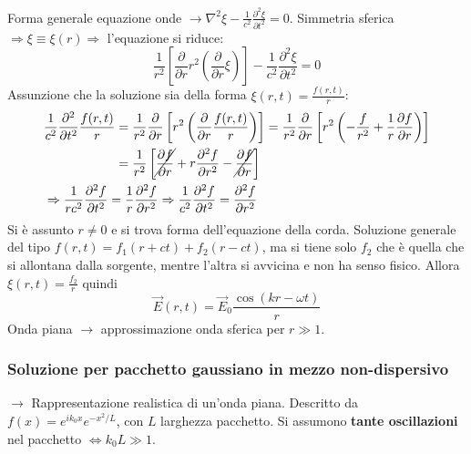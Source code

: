 \documentclass[10pt, a4paper]{scrartcl}
\numberwithin{equation}{subsection}
\theoremstyle{style1}
\begin{document}
Forma generale equazione onde $\to \nabla ^2 \xi  - \frac{1}{c^2} \frac{\partial ^2 \xi }{\partial t^2} = 0$. Simmetria sferica $\Rightarrow \xi \equiv \xi (r)\Rightarrow $ l'equazione si riduce:
\begin{equation}
	\frac{1}{r^2}\left[ \frac{\partial }{\partial r} r^2 \left(\frac{\partial }{\partial r} \xi \right)  \right]  -\frac{1}{c^2}\frac{\partial ^2\xi }{\partial t^2} =0
\end{equation}
Assunzione che la soluzione sia della forma $\xi (r,t) = \frac{f(r,t)}{r}$:
\begin{equation}
\begin{split}
	&\begin{split}
		\frac{1}{c^2}\frac{\partial ^2}{\partial t^2} \frac{f(r,t)}{r}&= \frac{1}{r^2}\frac{\partial }{\partial r} \left[ r^2 \left(\frac{\partial }{\partial r} \frac{f(r,t)}{r}\right)  \right] = \frac{1}{r^2 }\frac{\partial }{\partial r} \left[ r^2\left(-\frac{f}{r^2}+ \frac{1}{r}\frac{\partial f}{\partial r} \right)  \right] \\
									      &=\frac{1}{r^2}\left[ \cancel{\frac{\partial f}{\partial r} } + r \frac{\partial ^2 f}{\partial r^2} -\cancel{\frac{\partial f}{\partial r} } \right] 
	\end{split}\\
	&\Rightarrow \frac{1}{rc^2}\frac{\partial ^2f}{\partial t^2} = \frac{1}{r}\frac{\partial ^2 f}{\partial r^2} \Rightarrow \frac{1}{c^2}\frac{\partial ^2 f}{\partial t^2} = \frac{\partial ^2 f}{\partial r^2}
\end{split}
\end{equation}
Si \`e assunto $r\neq 0$ e si trova forma dell'equazione della corda. Soluzione generale del tipo $f(r,t) = f_1(r+ct) + f_2(r-ct)$, ma si tiene solo $f_2$ che \`e quella che si allontana dalla sorgente, mentre l'altra si avvicina e non ha senso fisico. Allora $\xi (r,t) = \frac{f_2}{r}$ quindi
\begin{equation}
	\vec{E}(r,t) = \vec{E}_0 \frac{\cos(kr - \omega t)}{r}
\end{equation}
Onda piana $\to$ approssimazione onda sferica per $r\gg 1$.

\subsubsection{Soluzione per pacchetto gaussiano in mezzo non-dispersivo}

$\to$ Rappresentazione realistica di un'onda piana. Descritto da $f(x) = e^{ik_0 x } e^{-x^2 / L} $, con $L$ larghezza pacchetto. Si assumono \textbf{tante oscillazioni} nel pacchetto $\iff k_0 L \gg 1$.
\end{document}
